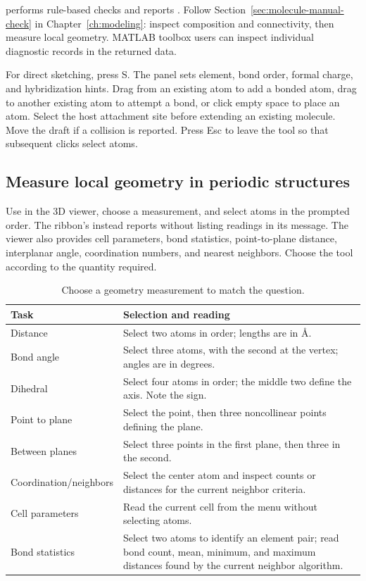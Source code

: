  performs rule-based checks and reports . Follow Section~\ref{sec:molecule-manual-check} in Chapter~\ref{ch:modeling}: inspect composition and connectivity, then measure local geometry. MATLAB\regmark{} toolbox users can inspect individual diagnostic records in the returned data.

For direct sketching, press S. The panel sets element, bond order, formal charge, and hybridization hints. Drag from an existing atom to add a bonded atom, drag to another existing atom to attempt a bond, or click empty space to place an atom. Select the host attachment site before extending an existing molecule. Move the draft if a collision is reported. Press Esc to leave the tool so that subsequent clicks select atoms.

\subsection{Measure local geometry in periodic structures}\label{sec:periodic-measure-reference}

Use  in the 3D viewer, choose a measurement, and select atoms in the prompted order. The ribbon's  instead reports  without listing readings in its message. The viewer also provides cell parameters, bond statistics, point-to-plane distance, interplanar angle, coordination numbers, and nearest neighbors. Choose the tool according to the quantity required.

\begin{table}[htbp]
\centering\small
\begin{tabularx}{\linewidth}{lX}
\toprule
Task & Selection and reading \\
\midrule
Distance & Select two atoms in order; lengths are in \AA. \\
Bond angle & Select three atoms, with the second at the vertex; angles are in degrees. \\
Dihedral & Select four atoms in order; the middle two define the axis. Note the sign. \\
Point to plane & Select the point, then three noncollinear points defining the plane. \\
Between planes & Select three points in the first plane, then three in the second. \\
Coordination/neighbors & Select the center atom and inspect counts or distances for the current neighbor criteria. \\
Cell parameters & Read the current cell from the menu without selecting atoms. \\
Bond statistics & Select two atoms to identify an element pair; read bond count, mean, minimum, and maximum distances found by the current neighbor algorithm. \\
\bottomrule
\end{tabularx}
\caption{Choose a geometry measurement to match the question.}
\end{table}

